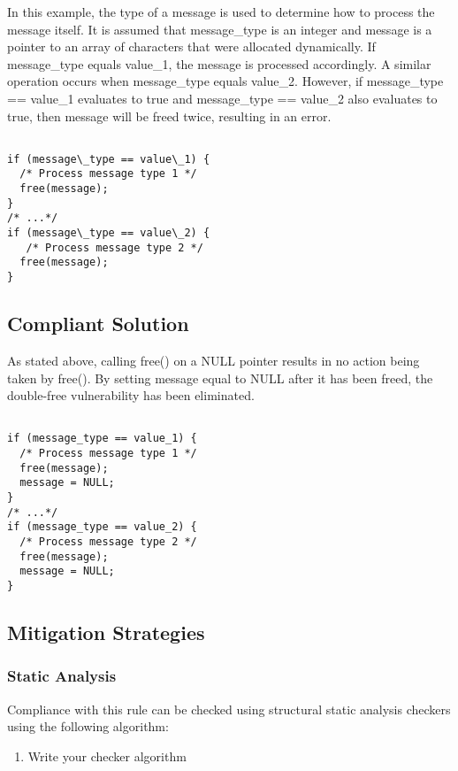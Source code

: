 In this example, the type of a message is used to determine how to process the
message itself. It is assumed that message\_type is an integer and message is a
pointer to an array of characters that were allocated dynamically. If
message\_type equals value\_1, the message is processed accordingly. A similar
operation occurs when message\_type equals value\_2. However, if message\_type
== value\_1 evaluates to true and message\_type == value\_2 also evaluates to
true, then message will be freed twice, resulting in an error.

\begin{verbatim}

if (message\_type == value\_1) {
  /* Process message type 1 */
  free(message);
}
/* ...*/
if (message\_type == value\_2) {
   /* Process message type 2 */
  free(message);
}

\end{verbatim}

\subsection{Compliant Solution}

As stated above, calling free() on a NULL pointer results in no action being
taken by free(). By setting message equal to NULL after it has been freed, the
double-free vulnerability has been eliminated.

\begin{verbatim}

if (message_type == value_1) {
  /* Process message type 1 */
  free(message);
  message = NULL;
}
/* ...*/
if (message_type == value_2) {
  /* Process message type 2 */
  free(message);
  message = NULL;
}

\end{verbatim}

\subsection{Mitigation Strategies}
\subsubsection{Static Analysis} 

Compliance with this rule can be checked using structural static analysis checkers using the following algorithm:

\begin{enumerate}
\item Write your checker algorithm
\end{enumerate}

